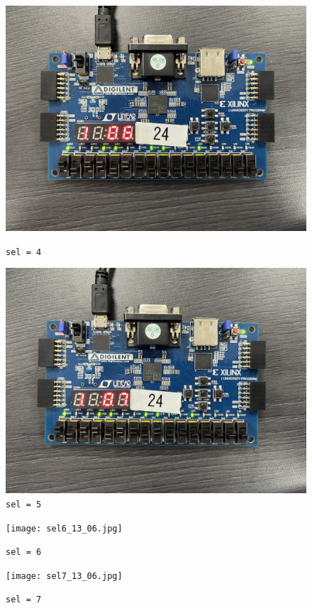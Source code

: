 \documentclass{scrartcl}
\begin{document}
\begin{figure}[H]
  \centering
  \begin{minipage}{0.45\linewidth}
    \centering
    \includegraphics[width=1\linewidth]{sel4_13_06.jpg}
    \caption{\texttt{sel = 4}}
  \end{minipage}\quad
  \begin{minipage}{0.45\linewidth}
    \centering
    \includegraphics[width=1\linewidth]{sel5_13_06.jpg}
    \caption{\texttt{sel = 5}}
  \end{minipage}
\end{figure}
\begin{figure}[H]
  \centering
  \begin{minipage}{0.45\linewidth}
    \centering
    \texttt{[image: sel6\_13\_06.jpg]}
    \caption{\texttt{sel = 6}}
  \end{minipage}\quad
  \begin{minipage}{0.45\linewidth}
    \centering
    \texttt{[image: sel7\_13\_06.jpg]}
    \caption{\texttt{sel = 7}}
  \end{minipage}
\end{figure}
\end{document}

